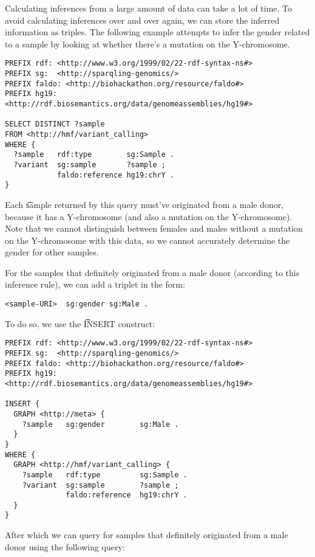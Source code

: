   Calculating inferences from a large amount of data can take a lot of time.
  To avoid calculating inferences over and over again, we can store the
  inferred information as triples.  The following example attempts to infer
  the gender related to a sample by looking at whether there's a mutation on
  the Y-chromosome.

\begin{lstlisting}[language=SPARQL]
PREFIX rdf: <http://www.w3.org/1999/02/22-rdf-syntax-ns#>
PREFIX sg:  <http://sparqling-genomics/>
PREFIX faldo: <http://biohackathon.org/resource/faldo#>
PREFIX hg19:  <http://rdf.biosemantics.org/data/genomeassemblies/hg19#>

SELECT DISTINCT ?sample
FROM <http://hmf/variant_calling>
WHERE {
  ?sample   rdf:type        sg:Sample .
  ?variant  sg:sample       ?sample ;
            faldo:reference hg19:chrY .
}
\end{lstlisting}

 Each \t{sample} returned by this query must've originated from a male
 donor, because it has a Y-chromosome (and also a mutation on the
 Y-chromosome).  Note that we cannot distinguish between females and males
 without a mutation on the Y-chromosome with this data, so we cannot accurately
 determine the gender for other samples.

 For the samples that definitely originated from a male donor (according to
 this inference rule), we can add a triplet in the form:

\begin{lstlisting}[language=SPARQL]
   <sample-URI>  sg:gender sg:Male .
\end{lstlisting}

  To do so, we use the \t{INSERT} construct:

\begin{lstlisting}[language=SPARQL]
PREFIX rdf: <http://www.w3.org/1999/02/22-rdf-syntax-ns#>
PREFIX sg:  <http://sparqling-genomics/>
PREFIX faldo: <http://biohackathon.org/resource/faldo#>
PREFIX hg19:  <http://rdf.biosemantics.org/data/genomeassemblies/hg19#>

INSERT {
  GRAPH <http://meta> {
    ?sample   sg:gender        sg:Male .
  }
}
WHERE {
  GRAPH <http://hmf/variant_calling> {
    ?sample   rdf:type         sg:Sample .
    ?variant  sg:sample        ?sample ;
              faldo:reference  hg19:chrY .
  }
}
\end{lstlisting}

  After which we can query for samples that definitely originated from a male
  donor using the following query:

